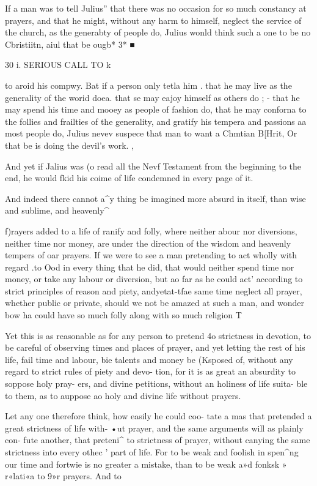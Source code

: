 \documentclass[
]{book}
\begin{document}
If a man was to tell Julius'' that there was no occasion for so much constancy at prayers, and that he might, without any harm to himself, neglect the service of the church, as the generabty of people do, Julius wonld think such a one to be no Cbristiitn, aiul that be ougb* 3* ■

30 i. SERIOUS CALL TO k

to aroid his compwy. Bat if a person only tetla him . that he may live as the generality of the worid doea. that se may eajoy himself as others do ; - that he may spend his time and mooey as people of fashion do, that he may conforna to the follies and frailties of the generality, and gratify his tempera and passions aa most people do, Julius nevev suspece that man to want a Chmtian B{[}Hrit, Or that be is doing the devil's work. ,

And yet if Jalius was (o read all the Nevf Testament from the beginning to the end, he would fkid his coime of life condemned in every page of it.

And indeed there cannot a\^{}y thing be imagined more absurd in itself, than wise and sublime, and heavenly\^{}

f)rayers added to a life of ranify and folly, where neither abour nor diversions, neither time nor money, are under the direction of the wisdom and heavenly tempers of oar prayers. If we were to see a man pretending to act wholly with regard .to Ood in every thing that he did, that would neither spend time nor money, or take any labour or diversion, but ao far as he could act' according to strict principles of reason and piety, andyetat-tfae same time neglect all prayer, whether public or private, should we not be amazed at such a man, and wonder bow ha could have so much folly along with so much religion T

Yet this is as reasonable as for any person to pretend 4o strictness in devotion, to be careful of observing times and places of prayer, and yet letting the rest of his life, fail time and labour, bie talents and money be (Ksposed of, without any regard to strict rules of piety and devo- tion, for it is as great an absurdity to soppose holy pray- ers, and divine petitions, without an holiness of life suita- ble to them, as to auppose ao holy and divine life without prayers.

Let any one therefore think, how easily he could coo- tate a mas that pretended a great strictness of life with- •ut prayer, and the same arguments will as plainly con- fute another, that preteni\^{} to strictness of prayer, without canying the same strictness into every othec ' part of life. For to be weak and foolish in spen\^{}ng our time and fortwie is no greater a mistake, than to be weak a»d fonksk » r«lati«a to 9»r prayers. And to
\end{document}
